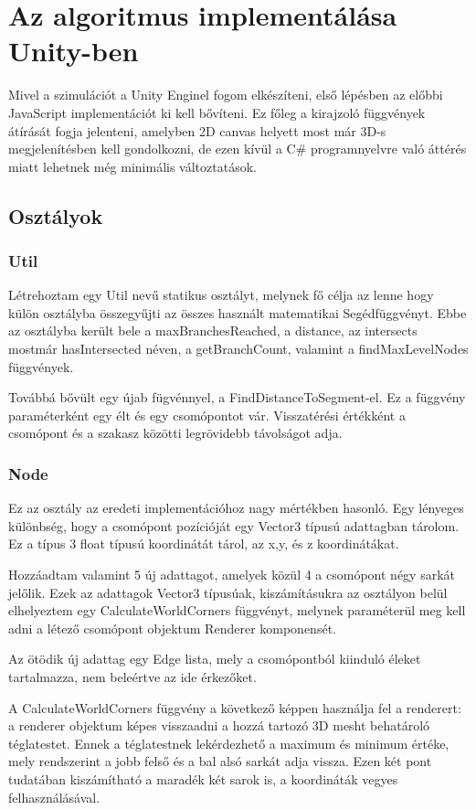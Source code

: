 \section{Az algoritmus implementálása Unity-ben}
Mivel a szimulációt a Unity Enginel fogom elkészíteni, első lépésben az előbbi JavaScript implementációt ki kell bővíteni. Ez főleg a kirajzoló függvények átírását fogja jelenteni, amelyben 2D canvas helyett most már 3D-s megjelenítésben kell gondolkozni, de ezen kívül a C\# programnyelvre való áttérés miatt lehetnek még minimális változtatások.
\subsection{Osztályok}
\subsubsection{Util}
Létrehoztam egy Util nevű statikus osztályt, melynek fő célja az lenne hogy külön osztályba összegyűjti az összes használt matematikai Segédfüggvényt. Ebbe az osztályba került bele a maxBranchesReached, a distance, az intersects mostmár hasIntersected néven, a getBranchCount, valamint a findMaxLevelNodes függvények. 

Továbbá bővült egy újab fügvénnyel, a FindDistanceToSegment-el. Ez a függvény paraméterként egy élt és egy csomópontot vár. Visszatérési értékként a csomópont és a szakasz közötti legrövidebb távolságot adja.
\subsubsection{Node}
Ez az osztály az eredeti implementációhoz nagy mértékben hasonló. Egy lényeges különbség, hogy a csomópont pozícióját egy Vector3 típusú adattagban tárolom. Ez a típus 3 float típusú koordinátát tárol, az x,y, és z koordinátákat.

Hozzáadtam valamint 5 új adattagot, amelyek közül 4 a csomópont négy sarkát jelőlik. Ezek az adattagok Vector3 típusúak, kiszámításukra az osztályon belül elhelyeztem egy CalculateWorldCorners függvényt, melynek paraméterül meg kell adni a létező csomópont objektum Renderer komponensét.

Az ötödik új adattag egy Edge lista, mely a csomópontból kiinduló éleket tartalmazza, nem beleértve az ide érkezőket.

A CalculateWorldCorners függvény a következő képpen használja fel a renderert: a renderer objektum képes visszaadni a hozzá tartozó 3D mesht behatároló téglatestet. Ennek a téglatestnek lekérdezhető a maximum és minimum értéke, mely rendszerint a jobb felső és a bal alsó sarkát adja vissza. Ezen két pont tudatában kiszámítható a maradék két sarok is, a koordináták vegyes felhasználásával.
